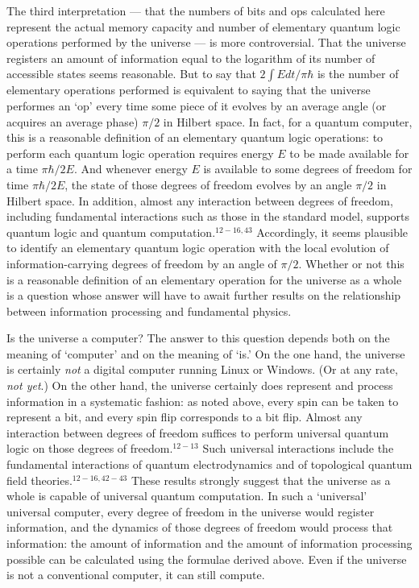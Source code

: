 The third interpretation --- that the numbers of bits and ops calculated
here represent the actual memory capacity and number of elementary quantum
logic operations performed by the universe --- is more
controversial.  That the universe registers an amount of information 
equal to the logarithm of its number of accessible states seems reasonable. 
But to say that $2\int E dt/\pi\hbar$ is the number of elementary operations
performed is equivalent to saying that the universe performes an `op' every 
time some piece of it evolves by an average angle (or acquires an
average phase) $\pi/2$ in Hilbert space.
In fact, for a quantum computer, this is a reasonable definition of an
elementary quantum logic operations: to perform 
each quantum logic operation requires energy $E$ to be
made available for a time $\pi\hbar/2E$.   And whenever energy $E$
is available to some degrees of freedom for time $\pi\hbar/2E$, the state of
those degrees of freedom evolves by an angle $\pi/2$ in Hilbert space.
In addition, almost any interaction between degrees of freedom, including
fundamental interactions such as those in the standard model, supports 
quantum logic and quantum computation.$^{12-16, 43}$  Accordingly, it seems 
plausible to identify an elementary quantum logic operation with the local 
evolution of information-carrying degrees of freedom by an angle
of $\pi/2$.  Whether or not this is a reasonable
definition of an elementary operation for the universe as a whole is a
question whose answer will have to await further results on the relationship
between information processing and fundamental physics.

Is the universe a computer?  The answer to this question depends both on the
meaning of `computer' and on the meaning of `is.'  On the one hand,
the universe is certainly {\it not} a digital computer running Linux or 
Windows.  (Or at any rate, {\it not yet}.)  On the other hand, the
universe certainly does represent and process information in a systematic
fashion: as noted above, every spin can be taken to represent a bit,
and every spin flip corresponds to a bit flip.  Almost any interaction
between degrees of freedom suffices to perform universal quantum
logic on those degrees of freedom.$^{12-13}$  Such universal interactions 
include the fundamental interactions of quantum electrodynamics and of
topological quantum field theories.$^{12-16,42-43}$  These results
strongly suggest that the universe as a whole is capable
of universal quantum computation.  In such a `universal' universal
computer, every degree
of freedom in the universe would register information, and
the dynamics of those degrees of freedom would process that information:
the amount of information and the amount of information processing possible
can be calculated using the formulae derived above.    
Even if the universe is not a conventional computer, it can still compute. 

